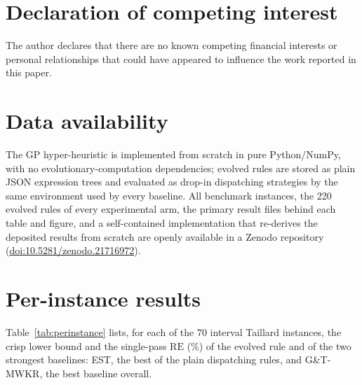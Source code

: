 \documentclass[review,authoryear,11pt]{elsarticle}
\newcommand{\RE}{\mathrm{RE}}
\begin{document}
\section*{Declaration of competing interest}
The author declares that there are no known competing financial
interests or personal relationships that could have appeared to
influence the work reported in this paper.

\section*{Data availability}
The GP hyper-heuristic is implemented from scratch in pure Python/NumPy,
with no evolutionary-computation dependencies; evolved rules are stored
as plain JSON expression trees and evaluated as drop-in dispatching
strategies by the same environment used by every baseline. All benchmark
instances, the 220 evolved rules of every experimental arm, the primary
result files behind each table and figure, and a self-contained
implementation that re-derives the deposited results from scratch are
openly available in a Zenodo repository~\citep{DiazDataset2026}
(\href{https://doi.org/10.5281/zenodo.21716972}{doi:10.5281/zenodo.21716972}).




\appendix
\setcounter{table}{0}
\setcounter{figure}{0}
\section{Per-instance results}
Table~\ref{tab:perinstance} lists, for each of the 70 interval Taillard
instances, the crisp lower bound and the single-pass $\RE$ (\%) of the
evolved rule and of the two strongest baselines: EST, the best of the
plain dispatching rules, and G\&T-MWKR, the best baseline overall.
\end{document}
